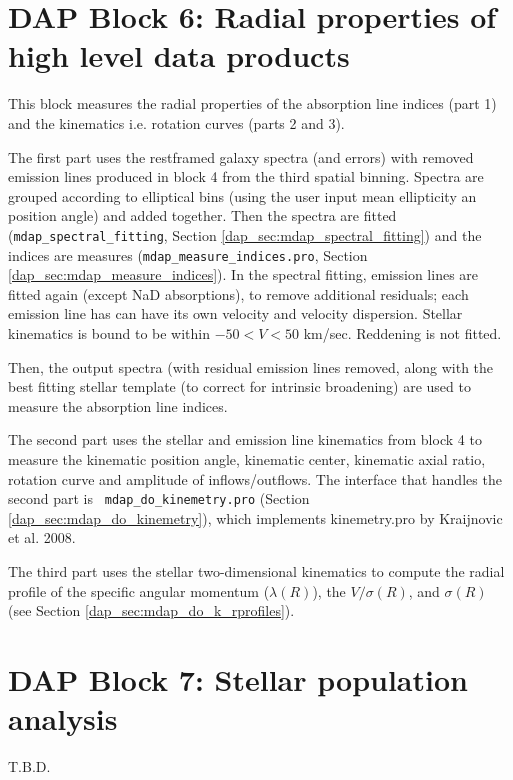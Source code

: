 \documentclass[11pt]{book}
\begin{document}
 

\section{DAP Block 6: Radial properties of high level data products}
\label{dap_sec:block6}

This block measures the radial properties of the absorption line
indices (part 1) and the kinematics i.e. rotation curves (parts 2 and
3).

The first part uses the restframed galaxy spectra (and errors) with
removed emission lines produced in block 4 from the third spatial
binning. Spectra are grouped according to elliptical bins (using the
user input mean ellipticity an position angle) and added
together. Then the spectra are fitted ({\tt mdap\_spectral\_fitting},
Section \ref{dap_sec:mdap_spectral_fitting}) and the indices are
measures ({\tt mdap\_measure\_indices.pro}, Section
\ref{dap_sec:mdap_measure_indices}).  In the spectral fitting,
emission lines are fitted again (except NaD absorptions), to remove
additional residuals; each emission line has can have its own velocity
and velocity dispersion. Stellar kinematics is bound to be within $-50
< V < 50$ km/sec. Reddening is not fitted.

Then, the output spectra (with residual emission lines removed, along
with the best fitting stellar template (to correct for intrinsic
broadening) are used to measure the absorption line indices.

The second part uses the stellar and emission line kinematics from
block 4 to measure the kinematic position angle, kinematic center,
kinematic axial ratio, rotation curve and amplitude of
inflows/outflows. The interface that handles the second part is {\tt
  mdap\_do\_kinemetry.pro} (Section \ref{dap_sec:mdap_do_kinemetry}),
which implements kinemetry.pro by Kraijnovic et al. 2008.

The third part uses the stellar two-dimensional kinematics to compute
the radial profile of the specific angular momentum ($\lambda(R)$),
the $V/\sigma(R)$, and $\sigma(R)$ (see Section
\ref{dap_sec:mdap_do_k_rprofiles}).









\section{DAP Block 7: Stellar population analysis}
\label{dap_sec:block7}
T.B.D.
\end{document}
